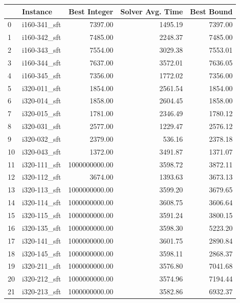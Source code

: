 \begin{tabular}{llrrr}
\toprule
{} &      Instance &  Best Integer &  Solver Avg. Time &  Best Bound \\
\midrule
0  &  i160-341\_sft &       7397.00 &           1495.19 &     7397.00 \\
1  &  i160-342\_sft &       7485.00 &           2248.37 &     7485.00 \\
2  &  i160-343\_sft &       7554.00 &           3029.38 &     7553.01 \\
3  &  i160-344\_sft &       7637.00 &           3572.01 &     7636.05 \\
4  &  i160-345\_sft &       7356.00 &           1772.02 &     7356.00 \\
5  &  i320-011\_sft &       1854.00 &           2561.54 &     1854.00 \\
6  &  i320-014\_sft &       1858.00 &           2604.45 &     1858.00 \\
7  &  i320-015\_sft &       1781.00 &           2346.49 &     1780.12 \\
8  &  i320-031\_sft &       2577.00 &           1229.47 &     2576.12 \\
9  &  i320-032\_sft &       2379.00 &            536.16 &     2378.18 \\
10 &  i320-043\_sft &       1372.00 &           3491.87 &     1371.07 \\
11 &  i320-111\_sft & 1000000000.00 &           3598.72 &     3872.11 \\
12 &  i320-112\_sft &       3674.00 &           1393.63 &     3673.13 \\
13 &  i320-113\_sft & 1000000000.00 &           3599.20 &     3679.65 \\
14 &  i320-114\_sft & 1000000000.00 &           3608.75 &     3606.64 \\
15 &  i320-115\_sft & 1000000000.00 &           3591.24 &     3800.15 \\
16 &  i320-135\_sft & 1000000000.00 &           3598.30 &     5223.20 \\
17 &  i320-141\_sft & 1000000000.00 &           3601.75 &     2890.84 \\
18 &  i320-145\_sft & 1000000000.00 &           3598.11 &     2868.37 \\
19 &  i320-211\_sft & 1000000000.00 &           3576.80 &     7041.68 \\
20 &  i320-212\_sft & 1000000000.00 &           3574.96 &     7194.44 \\
21 &  i320-213\_sft & 1000000000.00 &           3582.86 &     6932.37 \\

\end{tabular}
